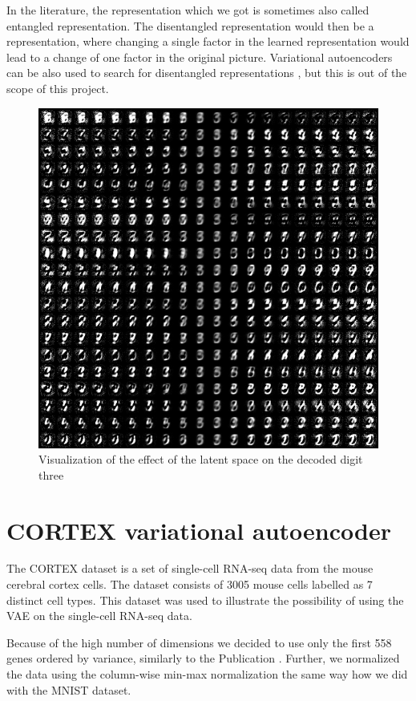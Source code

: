In the literature, the representation which we got is sometimes also called entangled representation.
The disentangled representation would then be a representation, where changing a single factor in the learned representation would lead to a change of one factor in the original picture.
Variational autoencoders can be also used to search for disentangled representations  \cite{higgins2016disentangled}, but this is out of the scope of this project.

\begin{figure}
    \centering
    \includegraphics[width=\linewidth]{images/sample.png}
    \caption{Visualization of the effect of the latent space on the decoded digit three}
    \label{fig:sample}
\end{figure}

\newpage
\section{CORTEX variational autoencoder}
The CORTEX dataset is a set of single-cell RNA-seq data from the mouse cerebral cortex cells.
The dataset consists of 3005 mouse cells labelled as 7 distinct cell types.
This dataset was used to illustrate the possibility of using the VAE on the single-cell RNA-seq data.

Because of the high number of dimensions we decided to use only the first 558 genes ordered by variance, similarly to the Publication \cite{lopez2018scvi}.
Further, we normalized the data using the column-wise min-max normalization the same way how we did with the MNIST dataset.

